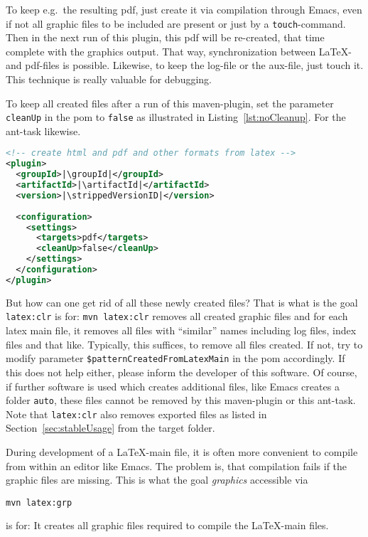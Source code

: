 To keep e.g.~the resulting pdf, 
just create it via compilation through Emacs, 
even if not all graphic files to be included are present 
or just by a \texttt{touch}-command. 
Then in the next run of this plugin, 
this pdf will be re-created, 
that time complete with the graphics output. 
That way, synchronization between \LaTeX- and pdf-files is possible. 
Likewise, to keep the log-file or the aux-file, just touch it. 
This technique is really valuable for debugging. 

To keep all created files after a run of this maven-plugin, 
set the parameter \texttt{cleanUp} in the pom 
to \texttt{false} as illustrated in Listing~\ref{lst:noCleanup}. 
For the ant-task likewise. 

\begin{lstlisting}[language=xml, basicstyle=\small,
escapechar=|,
float=b, captionpos=b, label={lst:noCleanup},
caption={Configuration without cleanup}]
<!-- create html and pdf and other formats from latex -->
<plugin>
  <groupId>|\groupId|</groupId>
  <artifactId>|\artifactId|</artifactId>
  <version>|\strippedVersionID|</version>
	
  <configuration>
    <settings>
      <targets>pdf</targets>
      <cleanUp>false</cleanUp>
    </settings>
  </configuration>
</plugin>
\end{lstlisting}


But how can one get rid of all these newly created files? 
That is what is the goal \texttt{latex:clr} is for: 
% 
\texttt{mvn latex:clr}
%
removes all created graphic files 
and for each latex main file, it removes all files with ``similar'' names
including log files, index files and that like.
Typically, this suffices, to remove all files created. 
If not, 
try to modify parameter \texttt{\$patternCreatedFromLatexMain} 
in the pom accordingly. 
If this does not help either, please inform the developer of this software. 
Of course, if further software is used which creates additional files, 
like Emacs creates a folder \texttt{auto}, 
these files cannot be removed by this maven-plugin or this ant-task.
Note that \texttt{latex:clr}
also removes exported files as listed in Section~\ref{sec:stableUsage}
from the target folder. 

During development of a \LaTeX-main file, 
it is often more convenient to compile from within an editor like Emacs. 
The problem is, that compilation fails if the graphic files are missing. 
This is what the goal \emph{graphics} accessible via 
% 
\begin{Verbatim}
mvn latex:grp
\end{Verbatim}
%
is for: 
It creates all graphic files required to compile the \LaTeX-main files. 

